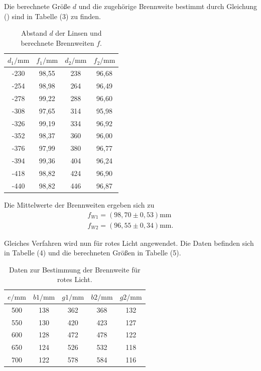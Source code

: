 Die berechnete Größe $d$ und die zugehörige Brennweite bestimmt durch Gleichung () sind in Tabelle (3) zu finden.
\begin{table}[H]
\centering
\caption{Abstand $d$ der Linsen und berechnete Brennweiten $f$.}
\label{tab:einzel1}
\begin{tabular}{c c c c}
\toprule
$d_1/\si{\milli\meter}$ & $f_1/\si{\milli\meter}$ & $d_2/\si{\milli\meter}$ & $f_2/\si{\milli\meter}$ \\
\midrule
-230 & 98,55 & 238 & 96,68\\
-254 & 98,98 & 264 & 96,49\\
-278 & 99,22 & 288 & 96,60\\
-308 & 97,65 & 314 & 95,98\\
-326 & 99,19 & 334 & 96,92\\
-352 & 98,37 & 360 & 96,00\\
-376 & 97,99 & 380 & 96,77\\
-394 & 99,36 & 404 & 96,24\\
-418 & 98,82 & 424 & 96,90\\
-440 & 98,82 & 446 & 96,87\\
\bottomrule
\end{tabular}
\end{table}

Die Mittelwerte der Brennweiten ergeben sich zu
\begin{align*}
f_{W1} = (98,70 \pm 0,53) \si{\milli\meter} \\
f_{W2} = (96,55 \pm 0,34) \si{\milli\meter} .
\end{align*}


Gleiches Verfahren wird nun für rotes Licht angewendet. Die Daten befinden sich in Tabelle (4) und die berechneten Größen in Tabelle (5).


\begin{table}[H]
\centering
\caption{Daten zur Bestimmung der Brennweite für rotes Licht.}
\label{tab:einzel1}
\begin{tabular}{c c c c c}
\toprule
$e/\si{\milli\meter}$ &$b1/\si{\milli\meter}$ & $g1/\si{\milli\meter}$ & $b2/\si{\milli\meter}$ & $g2/\si{\milli\meter}$ \\
\midrule
500 &138 & 362 & 368 & 132\\
550 &130 & 420 & 423 & 127\\
600 &128 & 472 & 478 & 122\\
650 &124 & 526 & 532 & 118\\
700 &122 & 578 & 584 & 116\\
\bottomrule
\end{tabular}
\end{table}


